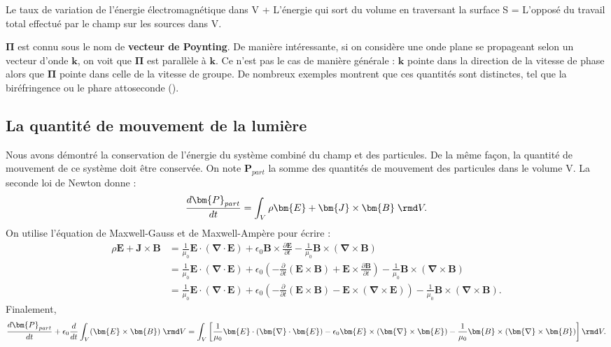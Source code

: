 Le taux de variation de l'énergie électromagnétique dans V + L'énergie qui sort du volume en traversant la surface S = L'opposé du travail total effectué par le champ sur les sources dans V.

$\bm{\Pi}$ est connu sous le nom de \textbf{vecteur de Poynting}. De manière intéressante, si on considère une onde plane se propageant selon un vecteur d'onde $\bm{k}$, on voit que $\bm{\Pi}$ est parallèle à $\bm{k}$. Ce n'est pas le cas de manière générale : $\bm{k}$ pointe dans la direction de la vitesse de phase alors que $\bm{\Pi}$ pointe dans celle de la vitesse de groupe. De nombreux exemples montrent que ces quantités sont distinctes, tel que la biréfringence ou le phare attoseconde (). 

\subsection{La quantité de mouvement de la lumière}
Nous avons démontré la conservation de l'énergie du système combiné du champ et des particules. De la même façon, la quantité de mouvement de ce système doit être conservée. On note $\bm{P}_{part}$ la somme des quantités de mouvement des particules dans le volume V. La seconde loi de Newton donne :
\begin{equation*}
\frac{d\bm{P}_{part}}{dt}=\int_V \rho \bm{E} + \bm{J}\times\bm{B}\;\rmd V.
\end{equation*} 
On utilise l'équation de Maxwell-Gauss et de Maxwell-Ampère pour écrire :
\begin{align*}
\rho \bm{E} + \bm{J}\times\bm{B} &= \frac{1}{\mu_0} \bm{E}\cdot(\bm{\nabla}\cdot\bm{E})+\epsilon_0 \bm{B}\times\frac{\partial \bm{E}}{\partial t}-\frac{1}{\mu_0}\bm{B}\times(\bm{\nabla}\times\bm{B})\\
&= \frac{1}{\mu_0} \bm{E}\cdot(\bm{\nabla}\cdot\bm{E})+\epsilon_0 
\left(-\frac{\partial}{\partial t}(\bm{E}\times\bm{B})+\bm{E}\times\frac{\partial \bm{B}}{\partial t}\right)
-\frac{1}{\mu_0}\bm{B}\times(\bm{\nabla}\times\bm{B})\\
&= \frac{1}{\mu_0} \bm{E}\cdot(\bm{\nabla}\cdot\bm{E})+\epsilon_0\left(-\frac{\partial}{\partial t}(\bm{E}\times\bm{B})-\bm{E}\times(\bm{\nabla}\times\bm{E})\right)
-\frac{1}{\mu_0}\bm{B}\times(\bm{\nabla}\times\bm{B}).
\end{align*} 
Finalement,
\begin{equation*}
\frac{d\bm{P}_{part}}{dt}+\epsilon_0\frac{d}{dt}\int_V (\bm{E}\times\bm{B})\; \rmd V=\int_V \left[\frac{1}{\mu_0} \bm{E}\cdot(\bm{\nabla}\cdot\bm{E})-\epsilon_0\bm{E}\times(\bm{\nabla}\times\bm{E})
-\frac{1}{\mu_0}\bm{B}\times(\bm{\nabla}\times\bm{B})\right]\rmd V.
\end{equation*} 


